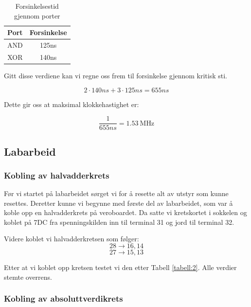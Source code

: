 \begin{table}[h]
  \centering
  \begin{tabular}{c c}

    Port & Forsinkelse\\
    \hline
    AND & 125ns\\
    XOR & 140ns\\

  \end{tabular}
  \caption{Forsinkelsestid gjennom porter}
  \label{tabell:3}
\end{table}

Gitt disse verdiene kan vi regne oss frem til forsinkelse gjennom kritisk sti.

\begin{displaymath}
  2 \cdot 140ns + 3 \cdot 125ns = 655ns
\end{displaymath}

Dette gir oss at maksimal klokkehastighet er:

\begin{displaymath}
  \frac{1}{655ns} = \SI{1.53}{\mega\hertz}
\end{displaymath}

\subsection{Labarbeid}

\subsubsection*{Kobling av halvadderkrets}

Før vi startet på labarbeidet sørget vi for å resette alt av utstyr som kunne resettes.
Deretter kunne vi begynne med første del av labarbeidet, som var å koble opp en halvadderkrets på veroboardet.
Da satte vi kretskortet i sokkelen og koblet på 7DC fra spenningskilden inn til terminal 31 og jord til terminal 32.

Videre koblet vi halvadderkretsen som følger:
\begin{displaymath}
  28 \rightarrow 16, 14
\end{displaymath}
\begin{displaymath}
  27 \rightarrow 15, 13
\end{displaymath}

Etter at vi koblet opp kretsen testet vi den etter Tabell \ref{tabell:2}. Alle verdier stemte overrens.

\subsubsection*{Kobling av absoluttverdikrets}

